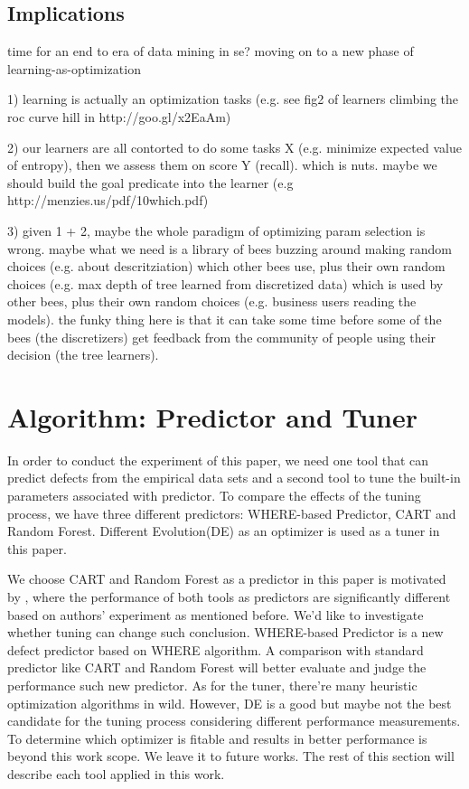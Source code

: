\documentclass{sig-alternative}
\begin{document}
\subsection{Implications}

time for an end to era of data mining in se? moving on to a new phase of learning-as-optimization

1) learning is actually an optimization tasks (e.g. see fig2 of  learners climbing the roc curve hill in http://goo.gl/x2EaAm)

2) our learners are all contorted to do some tasks X (e.g. minimize expected value of entropy), then we assess them on score Y (recall). which is nuts. maybe we should build the goal predicate into the learner (e.g http://menzies.us/pdf/10which.pdf) 

3) given 1 + 2, maybe the whole paradigm of optimizing param selection is wrong. maybe what we need is a library of bees buzzing around making random choices (e.g. about descritziation) which other bees use, plus their own random choices (e.g. max depth of tree learned from discretized data) which is used by other bees, plus their own random choices (e.g. business users reading the models).  the funky thing here is that it can take some time before some of the bees (the discretizers) get feedback from the community of people using their decision (the tree learners). 

\section{Algorithm: Predictor and Tuner}

In order to conduct the experiment of this paper, we need one tool that can predict defects 
from the empirical data sets and a second tool to tune the built-in parameters associated with 
predictor. To compare the effects of the tuning process, we have three different predictors: 
WHERE-based Predictor, CART and Random Forest. Different Evolution(DE) as an optimizer 
is used as a tuner in this paper.

We choose CART and Random Forest as a predictor in this paper is motivated by 
\cite{lessmann2008benchmarking}, where the performance of both tools as predictors are 
significantly different based on authors' experiment as mentioned before. We'd like to 
investigate whether tuning can change such conclusion. WHERE-based Predictor is a new 
defect predictor based on WHERE\cite{menzies2013local} algorithm. A comparison with 
standard predictor like CART and Random Forest will better evaluate and judge the 
performance such new predictor. As for the tuner, there're many heuristic optimization 
algorithms in wild. However, DE is a good but maybe not the best candidate for the tuning 
process considering different performance measurements. To determine which optimizer is 
fitable and results in better performance is beyond this work scope. We leave it to future 
works. The rest of this section will describe each tool applied in this work.
\end{document}
